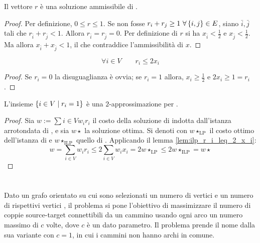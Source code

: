 \begin{lemma}\label{lem:ilp_r_ammiss}
	Il vettore $r$ è una soluzione ammissibile di \IntegerLinearProgramming.
\end{lemma}
\begin{proof}
	Per definizione, $0\leq r\leq 1$. Se non fosse $r_i+r_j\geq 1~\forall \left\{ i,j \right\}\in E$, siano $\bar i,\bar j$ tali che $r_{\bar i}+r_{\bar j}<1$.
	Allora $r_{\bar i}=r_{\bar j}=0$. Per definizione di $r$ si ha $x_{\bar i}<\frac 12$ e $x_{\bar j}<\frac 12$.
	Ma allora $x_{\bar i}+x_{\bar j}<1$, il che contraddice l'ammissibilità di $x$.
\end{proof}

\begin{lemma}\label{lem:ilp_r_i_leq_2_x_i}
	\begin{equation*}
		\forall i\in V \qquad r_i \leq 2x_i
	\end{equation*}
\end{lemma}
\begin{proof}
	Se $r_i=0$ la disuguaglianza è ovvia;
	se $r_i=1$ allora, $x_i\geq \frac 12$ e $2x_i\geq 1=r_i$.
\end{proof}

\begin{theorem}\label{lem:ilp_appr}
	L'insieme $\left\{ i\in V\mid r_i=1 \right\}$ è una $2$-approssimazione per \VertexCover.
\end{theorem}
\begin{proof}
	Sia $w:=\sum{i\in V} w_i r_i$ il costo della soluzione di \VertexCover indotta dall'istanza arrotondata di \LinearProgramming, e sia $w\star$ la soluzione ottima. Si denoti con $w\star_{\text{LP}}$ il costo ottimo dell'istanza di \LinearProgramming e $w\star_{\text{ILP}}$ quello di \IntegerLinearProgramming.
	Applicando il lemma \ref{lem:ilp_r_i_leq_2_x_i}:
	\begin{equation*}
		w = \sum_{i\in V} w_i r_i \leq 2\sum_{i\in V} w_i x_i = 2w\star_{\text{LP}} \leq 2w\star_{\text{ILP}} = w\star
	\end{equation*}
\end{proof}





\section{\DisjointPaths}
Dato un grafo orientato su cui sono selezionati un numero di vertici  e un numero di rispettivi vertici , il problema \DisjointPaths si pone l'obiettivo di massimizzare il numero di coppie source-target connettibili da un cammino usando ogni arco un numero massimo di $c$ volte, dove $c$ è un dato parametro. Il problema prende il nome dalla sua variante con $c=1$, in cui i cammini non hanno archi in comune.

